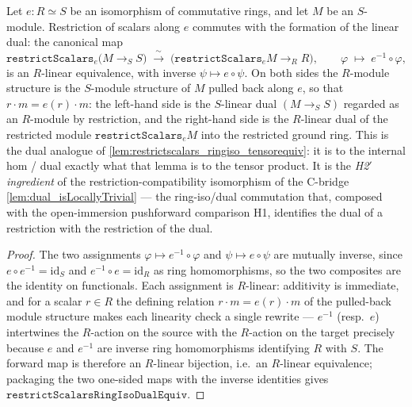 \begin{lemma}\leanok
  \label{lem:restrictscalars_ringiso_dualequiv}
  Let \(e : R \simeq S\) be an isomorphism of commutative rings, and let \(M\) be an
  \(S\)-module. Restriction of scalars along \(e\) commutes with the formation of the
  linear dual: the canonical map
  \[
    \mathtt{restrictScalars}_e\bigl(M \to_S S\bigr)
      \;\xrightarrow{\ \sim\ }\;
    \bigl(\mathtt{restrictScalars}_e M \to_R R\bigr),
    \qquad \varphi \;\longmapsto\; e^{-1} \circ \varphi,
  \]
  is an \(R\)-linear equivalence, with inverse \(\psi \mapsto e \circ \psi\). On both
  sides the \(R\)-module structure is the \(S\)-module structure of \(M\) pulled back
  along \(e\), so that \(r \cdot m = e(r) \cdot m\): the left-hand side is the
  \(S\)-linear dual \((M \to_S S)\) regarded as an \(R\)-module by restriction, and the
  right-hand side is the \(R\)-linear dual of the restricted module
  \(\mathtt{restrictScalars}_e M\) into the restricted ground ring. This is the dual
  analogue of \cref{lem:restrictscalars_ringiso_tensorequiv}: it is to the internal hom
  / dual exactly what that lemma is to the tensor product. It is the \emph{H2$'$
  ingredient} of the restriction-compatibility isomorphism of the C-bridge
  \cref{lem:dual_isLocallyTrivial} --- the ring-iso/dual commutation that, composed with
  the open-immersion pushforward comparison H1, identifies the dual of a restriction
  with the restriction of the dual.
\end{lemma}

\begin{proof}

\leanok
  The two assignments \(\varphi \mapsto e^{-1} \circ \varphi\) and
  \(\psi \mapsto e \circ \psi\) are mutually inverse, since \(e \circ e^{-1} =
  \mathrm{id}_S\) and \(e^{-1} \circ e = \mathrm{id}_R\) as ring homomorphisms, so the
  two composites are the identity on functionals. Each assignment is \(R\)-linear:
  additivity is immediate, and for a scalar \(r \in R\) the defining relation
  \(r \cdot m = e(r) \cdot m\) of the pulled-back module structure makes each linearity
  check a single rewrite --- \(e^{-1}\) (resp.\ \(e\)) intertwines the \(R\)-action on
  the source with the \(R\)-action on the target precisely because \(e\) and \(e^{-1}\)
  are inverse ring homomorphisms identifying \(R\) with \(S\). The forward map is
  therefore an \(R\)-linear bijection, i.e.\ an \(R\)-linear equivalence; packaging the
  two one-sided maps with the inverse identities gives
  \(\mathtt{restrictScalarsRingIsoDualEquiv}\).
\end{proof}

